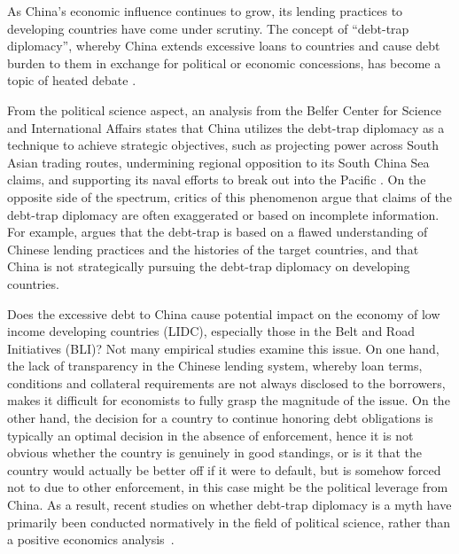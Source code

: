 As China's economic influence continues to grow, its lending practices to developing countries have come under scrutiny.
The concept of ``debt-trap diplomacy'', whereby China extends excessive loans to countries and cause debt burden to them in exchange for political or economic concessions, has become a topic of heated debate \citep{Chellaney_2017}.

From the political science aspect, an analysis from the Belfer Center for Science and International Affairs states that China utilizes the debt-trap diplomacy as a technique to achieve strategic objectives, such as projecting power across South Asian trading routes, undermining regional opposition to its South China Sea claims, and supporting its naval efforts to break out into the Pacific \citep*{Parker2018}.
On the opposite side of the spectrum, critics of this phenomenon argue that claims of the debt-trap diplomacy are often exaggerated or based on incomplete information. For example, \citet*{Brautigam-meme-2020} argues that the debt-trap is based on a flawed understanding of Chinese lending practices and the histories of the target countries, and that China is not strategically pursuing the debt-trap diplomacy on developing countries.

Does the excessive debt to China cause potential impact on the economy of low income developing countries (LIDC), especially those in the Belt and Road Initiatives (BLI)? Not many empirical studies examine this issue.
On one hand, the lack of transparency in the Chinese lending system, whereby loan terms, conditions and collateral requirements are not always disclosed to the borrowers, makes it difficult for economists to fully grasp the magnitude of the issue.
On the other hand, the decision for a country to continue honoring debt obligations is typically an optimal decision in the absence of enforcement, hence it is not obvious whether the country is genuinely in good standings, or is it that the country would actually be better off if it were to default, but is somehow forced not to due to other enforcement, in this case might be the political leverage from China.
As a result, recent studies on whether debt-trap diplomacy is a myth have primarily been conducted normatively in the field of political science, rather than a positive economics analysis~\citep[see, e.g.,][]{Himmer2023-vn,Chen2020-eo}.

